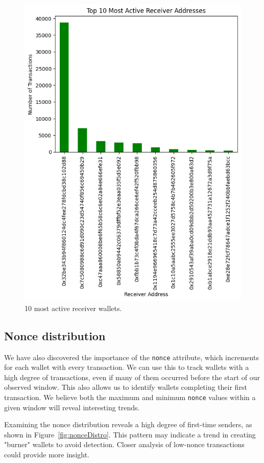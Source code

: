 \documentclass[sigconf]{acmart}
\begin{document}
\begin{figure}[H]
    \centering
    \includegraphics[width=0.8\linewidth]{M4-active-receiver.png}
    \caption{10 most active receiver wallets.}
    \label{fig:activeReceivers}
\end{figure}

\subsection{Nonce distribution}
We have also discovered the importance of the \texttt{nonce} attribute, which increments for each wallet with every transaction. We can use this to track wallets with a high degree of transactions, even if many of them occurred before the start of our observed window. This also allows us to identify wallets completing their first transaction. We believe both the maximum and minimum \texttt{nonce} values within a given window will reveal interesting trends.

Examining the nonce distribution reveals a high degree of first-time senders, as shown in Figure~\ref{fig:nonceDistro}. This pattern may indicate a trend in creating "burner" wallets to avoid detection. Closer analysis of low-nonce transactions could provide more insight.
\end{document}
